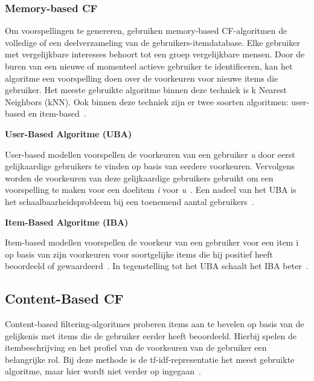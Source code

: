 \subsubsection{Memory-based CF}
Om voorspellingen te genereren, gebruiken memory-based CF-algoritmen de volledige of een deelverzameling van de gebruikers-itemdatabase. Elke gebruiker met vergelijkbare interesses behoort tot een groep vergelijkbare mensen. Door de buren van een nieuwe of momenteel actieve gebruiker te identificeren, kan het algoritme een voorspelling doen over de voorkeuren voor nieuwe items die gebruiker. Het meeste gebruikte algoritme binnen deze techniek is k Nearest Neighbors (kNN). Ook binnen deze techniek zijn er twee soorten algoritmen: user-based en item-based~\autocite{Thorat2015}.\par
\medskip
\textbf{User-Based Algoritme (UBA)}\par
User-based modellen voorspellen de voorkeuren van een gebruiker \textit{u} door eerst gelijkaardige gebruikers te vinden op basis van eerdere voorkeuren. Vervolgens worden de voorkeuren van deze gelijkaardige gebruikers gebruikt om een voorspelling te maken voor een doelitem \textit{i} voor \textit{u}~\autocite{Dong2022}. Een nadeel van het UBA is het schaalbaarheidsprobleem bij een toenemend aantal gebruikers~\autocite{Thorat2015}.\par
\medskip
\textbf{Item-Based Algoritme (IBA)}\par
Item-based modellen voorspellen de voorkeur van een gebruiker voor een item i op basis van zijn voorkeuren voor soortgelijke items die hij positief heeft beoordeeld of gewaardeerd~\autocite{Thorat2015,Dong2022}. In tegenstelling tot het UBA schaalt het IBA beter~\autocite{Thorat2015}.

\subsection{Content-Based CF}
Content-based filtering-algoritmes proberen items aan te bevelen op basis van de gelijkenis met items die de gebruiker eerder heeft beoordeeld. Hierbij spelen de itembeschrijving en het profiel van de voorkeuren van de gebruiker een belangrijke rol. Bij deze methode is de tf-idf-representatie het meest gebruikte algoritme, maar hier wordt niet verder op ingegaan~\autocite{Thorat2015}.


